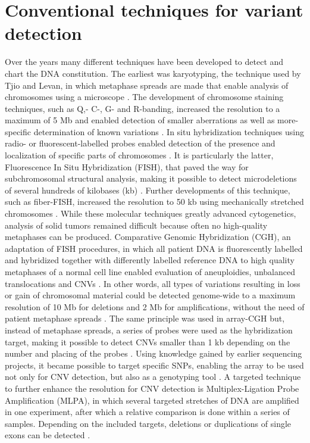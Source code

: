 \section{Conventional techniques for variant detection} \label{intro_traditional}
Over the years many different techniques have been developed to detect and chart the DNA constitution. 
The earliest was karyotyping, the technique used by Tjio and Levan, in which metaphase spreads are made that enable analysis of chromosomes using a microscope \cite{Tjio_1956}. 
The development of chromosome staining techniques, such as Q,- C-, G- and R-banding, increased the resolution to a maximum of 5 Mb and enabled detection of smaller aberrations as well as more-specific determination of known variations \cite{Hamerton_1972,Liu_2015}. 
In situ hybridization techniques using radio- or fluorescent-labelled probes enabled detection of the presence and localization of specific parts of chromosomes \cite{Gall_1969,Bauman_1980,Levsky_2003}. 
It is particularly the latter, Fluorescence In Situ Hybridization (FISH), that paved the way for subchromosomal structural analysis, making it possible to detect microdeletions of several hundreds of kilobases (kb) \cite{Cui_2016}. 
Further developments of this technique, such as fiber-FISH, increased the resolution to 50 kb using mechanically stretched chromosomes \cite{Raap_1996}.
While these molecular techniques greatly advanced cytogenetics, analysis of solid tumors remained difficult because often no high-quality metaphases can be produced. 
Comparative Genomic Hybridization (CGH), an adaptation of FISH procedures, in which all patient DNA is fluorescently labelled and hybridized together with differently labelled reference DNA to high quality metaphases of a normal cell line enabled evaluation of aneuploidies, unbalanced translocations and CNVs \cite{Kallioniemi_1992}.
In other words, all types of variations resulting in loss or gain of chromosomal material could be detected genome-wide to a maximum resolution of 10 Mb for deletions and 2 Mb for amplifications, without the need of patient metaphase spreads \cite{James_1999b}. 
The same principle was used in array-CGH but, instead of metaphase spreads, a series of probes were used as the hybridization target, making it possible to detect CNVs smaller than 1 kb depending on the number and placing of the probes \cite{Pinkel_1998,Boone_2010}. 
Using knowledge gained by earlier sequencing projects, it became possible to target specific SNPs, enabling the array to be used not only for CNV detection, but also as a genotyping tool \cite{Wang_1998}. 
A targeted technique to further enhance the resolution for CNV detection is Multiplex-Ligation Probe Amplification (MLPA), in which several targeted stretches of DNA are amplified in one experiment, after which a relative comparison is done within a series of samples. 
Depending on the included targets, deletions or duplications of single exons can be detected \cite{Schouten_2002}.

